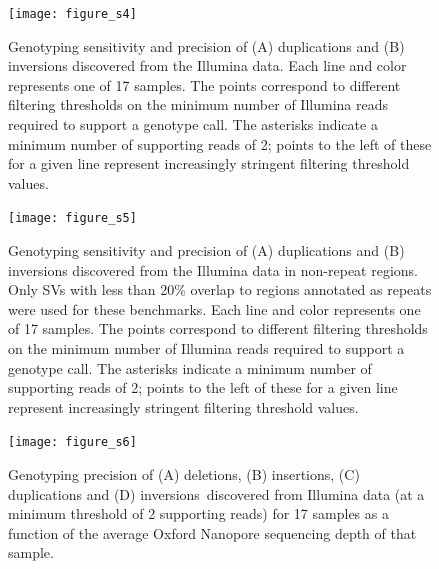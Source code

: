 \documentclass[12pt]{article}
\newenvironment{cfigure}
	{\begin{figure} \centering}
	{\end{figure}}
\begin{document}
\clearpage%

\begin{cfigure}
	\texttt{[image: figure\_s4]}
	
	\caption[Sensitivity and precision of Illumina duplication and inversion genotyping]{
		Genotyping sensitivity and precision of (A) duplications and (B) inversions discovered from the Illumina data.
		Each line and color represents one of 17 samples. 
		The points correspond to different filtering thresholds on the minimum number of Illumina reads required to support a genotype call.
		The asterisks indicate a minimum number of supporting reads of 2; points to the left of these for a given line represent increasingly stringent filtering threshold values.
	}

	\label{fig_s4}

\end{cfigure}

\clearpage%

\begin{cfigure}
	\texttt{[image: figure\_s5]}

	\caption[Sensitivity and precision of Illumina duplication and inversion genotyping in non-repeat regions]{
		Genotyping sensitivity and precision of (A) duplications and (B) inversions discovered from the Illumina data in non-repeat regions.
		Only SVs with less than 20\% overlap to regions annotated as repeats were used for these benchmarks. 
		Each line and color represents one of 17 samples. 
		The points correspond to different filtering thresholds on the minimum number of Illumina reads required to support a genotype call.
		The asterisks indicate a minimum number of supporting reads of 2; points to the left of these for a given line represent increasingly stringent filtering threshold values.
	}

	\label{fig_s5}

\end{cfigure}

\clearpage%

\begin{cfigure}
	\texttt{[image: figure\_s6]}

	\caption[Relationship between Oxford Nanopore sequencing depth and genotyping precision of Illumina SVs]{
		Genotyping precision of (A) deletions, (B) insertions, (C) duplications and (D) inversions~discovered from Illumina data (at a minimum threshold of 2 supporting reads) for 17 samples as a function of the average Oxford Nanopore sequencing depth of that sample.
	}

	\label{fig_s6}

\end{cfigure}
\end{document}
